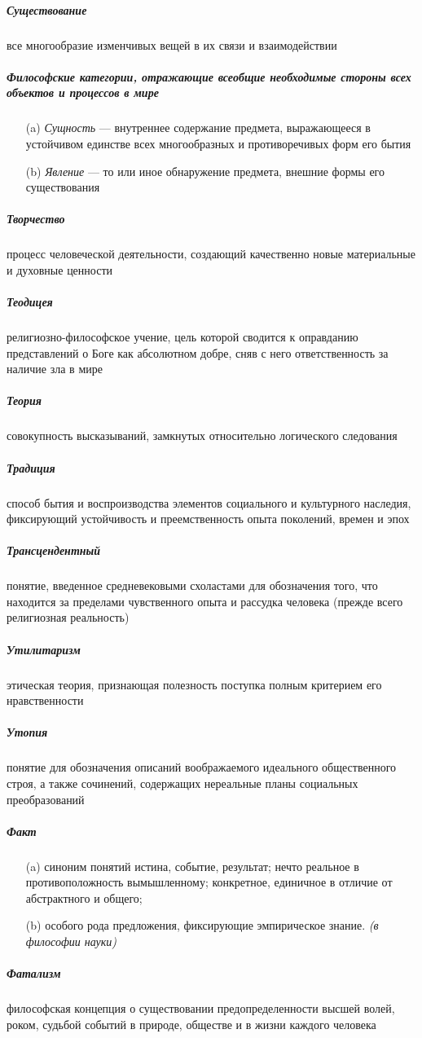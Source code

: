 \documentclass[a4paper, 12pt]{article}
\theoremstyle{plain} %
\theoremstyle{definition} %
\theoremstyle{remark} %
\begin{document}
\subparagraph{Существование}
	все многообразие изменчивых вещей в их связи и взаимодействии

\subparagraph{Философские категории, отражающие всеобщие необходимые стороны всех объектов и процессов в мире}
\begin{itemize}
	\item[(a)] \emph{Сущность} --- внутреннее содержание предмета, выражающееся в устойчивом единстве всех многообразных и противоречивых форм его бытия
	\item[(b)] \emph{Явление} --- то или иное обнаружение предмета, внешние формы его существования
\end{itemize}

\subparagraph{Творчество}
	процесс человеческой деятельности, создающий качественно новые материальные и духовные ценности

\subparagraph{Теодицея}
	религиозно-философское учение, цель которой сводится к оправданию представлений о Боге как абсолютном добре, сняв с него ответственность за наличие зла в мире

\subparagraph{Теория}
	совокупность высказываний, замкнутых относительно логического следования


\subparagraph{Традиция}
	способ бытия и воспроизводства элементов социального и культурного наследия, фиксирующий устойчивость и преемственность опыта поколений, времен и эпох

\subparagraph{Трансцендентный}
	понятие, введенное средневековыми схоластами для обозначения того, что находится за пределами чувственного опыта и рассудка человека (прежде всего религиозная реальность)

\subparagraph{Утилитаризм}
	этическая теория, признающая полезность поступка полным критерием его нравственности

\subparagraph{Утопия}
	понятие для обозначения описаний воображаемого идеального общественного строя, а также сочинений, содержащих нереальные планы социальных преобразований

\subparagraph{Факт}
\begin{itemize}
	\item[(a)]  синоним понятий истина, событие, результат; нечто реальное в противоположность вымышленному; конкретное, единичное в отличие от абстрактного и общего;
	\item[(b)] особого рода предложения, фиксирующие эмпирическое знание. \emph{(в философии науки)}
\end{itemize}

\subparagraph{Фатализм}
	философская концепция о существовании предопределенности высшей волей, роком, судьбой событий в природе, обществе и в жизни каждого человека
\end{document}
